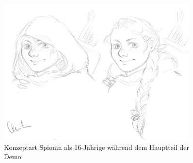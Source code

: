 \begin{figure}[tbh]
	\centering
	\includegraphics[width=0.9\textwidth]{Abbildungen/Abenteuer/Hauptcharaktere/spionin}
	\caption[Konzeptart Spionin]{Konzeptart Spionin als 16-Jährige während dem Hauptteil der Demo.}
	\label{fig:mc-spionin}
\end{figure}
